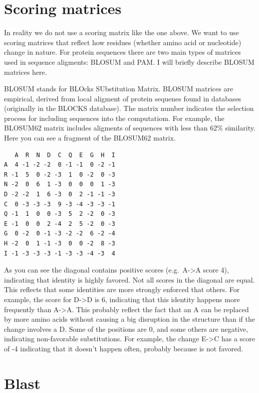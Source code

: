 \documentclass[]{book}
\theoremstyle{definition}
\theoremstyle{definition}
\theoremstyle{definition}
\theoremstyle{remark}
\begin{document}
\section{Scoring matrices}\label{scoring-matrices}

In reality we do not use a scoring matrix like the one above. We want to
use scoring matrices that reflect how residues (whether amino acid or
nucleotide) change in nature. For protein sequences there are two main
types of matrices used in sequence aligments: BLOSUM and PAM. I will
briefly describe BLOSUM matrices here.

BLOSUM stands for BLOcks SUbstitution Matrix. BLOSUM matrices are
empirical, derived from local aligment of protein sequenes found in
databases (originally in the BLOCKS database). The matrix number
indicates the selection process for including sequences into the
computatiom. For example, the BLOSUM62 matrix includes aligments of
sequences with less than 62\% similarity. Here you can see a fragment of
the BLOSUM62 matrix.

\begin{verbatim}
   A  R  N  D  C  Q  E  G  H  I
A  4 -1 -2 -2  0 -1 -1  0 -2 -1
R -1  5  0 -2 -3  1  0 -2  0 -3
N -2  0  6  1 -3  0  0  0  1 -3
D -2 -2  1  6 -3  0  2 -1 -1 -3
C  0 -3 -3 -3  9 -3 -4 -3 -3 -1
Q -1  1  0  0 -3  5  2 -2  0 -3
E -1  0  0  2 -4  2  5 -2  0 -3
G  0 -2  0 -1 -3 -2 -2  6 -2 -4
H -2  0  1 -1 -3  0  0 -2  8 -3
I -1 -3 -3 -3 -1 -3 -3 -4 -3  4
\end{verbatim}

As you can see the diagonal contains positive scores
(e.g.~A-\textgreater{}A score 4), indicating that identity is highly
favored. Not all scores in the diagonal are equal. This reflects that
some identities are more strongly enforced that others. For example, the
score for D-\textgreater{}D is 6, indicating that this identity happens
more frequently than A-\textgreater{}A. This probably reflect the fact
that an A can be replaced by more amino acids without causing a big
disruption in the structure than if the change involves a D. Some of the
positions are 0, and some others are negative, indicating non-favorable
substitutions. For example, the change E-\textgreater{}C has a score of
-4 indicating that it doesn't happen often, probably because is not
favored.

\section{Blast}\label{blast}
\end{document}
